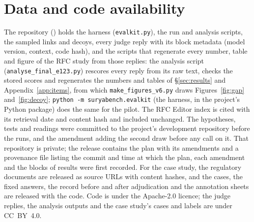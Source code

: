 \section{Data and code availability}
\label{sec:availability}
The repository (\repourl) holds the harness (\texttt{evalkit.py}), the run and analysis scripts, the sampled links and
decoys, every judge reply with its block metadata (model version, context, code hash), and the scripts that regenerate
every number, table and figure of the RFC study from those replies: the analysis script (\texttt{analyse\_final\_e123.py}) rescores every reply
from its raw text, checks the stored scores and regenerates the numbers and tables of \S\ref{sec:results} and Appendix~\ref{app:items}, from which
\texttt{make\_figures\_v6.py} draws Figures~\ref{fig:gap} and~\ref{fig:decoy};
\texttt{python -m suryabench.evalkit} (the harness, in the project's Python package) does the same for the pilot. The RFC Editor index is cited with its retrieval
date and content hash \citep{rfcindex2026} and included unchanged. The hypotheses, tests and readings were committed to
the project's development repository before the runs, and the amendment adding the second draw before any call on it.
That repository is private; the release contains the plan with its amendments and a provenance file listing the commit
and time at which the plan, each amendment and the blocks of results were first recorded. For the case study, the regulatory
documents are released as source URLs with content hashes, and the cases, the fixed answers, the record before and
after adjudication and the annotation sheets are released with the code. Code is under the Apache-2.0 licence; the
judge replies, the analysis outputs and the case study's cases and labels are under CC~BY~4.0.
